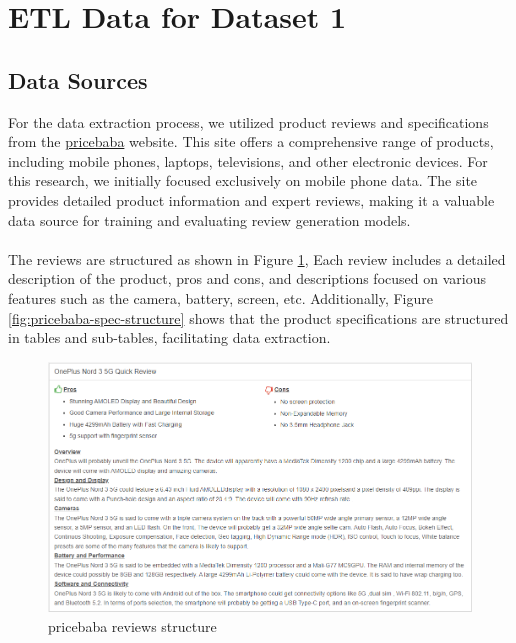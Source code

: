 \section{ETL Data for Dataset 1}
\subsection{Data Sources}
For the data extraction process, we utilized product reviews and specifications from the \href{https://pricebaba.com/}{pricebaba} website. This site offers a comprehensive range of products, including mobile phones, laptops, televisions, and other electronic devices. For this research, we initially focused exclusively on mobile phone data. The site provides detailed product information and expert reviews, making it a valuable data source for training and evaluating review generation models.
\\\\
The reviews are structured as shown in Figure \ref{fig:pricebaba-review-structure}, Each review includes a detailed description of the product, pros and cons, and descriptions focused on various features such as the camera, battery, screen, etc. Additionally, Figure \ref{fig:pricebaba-spec-structure} shows that the product specifications are structured in tables and sub-tables, facilitating data extraction.
\begin{figure}[H]
    \centering
    \includegraphics[width=12cm]{images/pricebaba_review_structure.png}
    \caption{pricebaba reviews structure \cite{OnePlusNord35G2023}}
    \label{fig:pricebaba-review-structure}
\end{figure}
